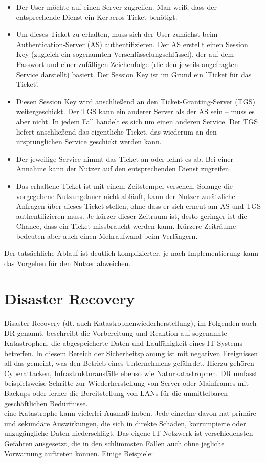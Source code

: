 \documentclass[letterpaper, 12pt]{article}
\let\tempsection\section
\renewcommand\section[1]{\vspace{-0.3cm}\tempsection{#1}\vspace{-0.3cm}}
\begin{document}
\begin{itemize}
	\item Der User möchte auf einen Server zugreifen. Man weiß, dass der entsprechende Dienst ein Kerberos-Ticket benötigt.
	\item Um dieses Ticket zu erhalten, muss sich der User zunächst beim Authentication-Server (AS) authentifizieren. Der AS erstellt einen Session Key (zugleich ein sogenannten Verschlüsselungschlüssel), der auf dem Passwort und einer zufälligen Zeichenfolge (die den jeweils angefragten Service darstellt) basiert. Der Session Key ist im Grund ein 'Ticket für das Ticket'.
	\item Diesen Session Key wird anschließend an den Ticket-Granting-Server (TGS) weitergeschickt. Der TGS kann ein anderer  Server als der AS sein – muss es aber nicht. In jedem Fall handelt es sich um einen anderen Service. Der TGS liefert anschließend das eigentliche Ticket, das wiederum an den ursprünglichen Service geschickt werden kann.
	\item Der jeweilige Service nimmt das Ticket an oder lehnt es ab. Bei einer Annahme kann der Nutzer auf den entsprechenden Dienst zugreifen. \clearpage
	\item Das erhaltene Ticket ist mit einem Zeitstempel versehen. Solange die vorgegebene Nutzungdauer nicht abläuft, kann der Nutzer zusätzliche Anfragen über dieses Ticket stellen, ohne dass er sich erneut am AS und TGS authentifizieren muss. Je kürzer dieser Zeitraum ist, desto geringer ist die Chance, dass ein Ticket missbraucht werden kann. Kürzere Zeiträume bedeuten aber auch einen Mehraufwand beim Verlängern.
\end{itemize}

Der tatsächliche Ablauf ist deutlich komplizierter, je nach Implementierung kann das Vorgehen für den Nutzer abweichen. \cite{kerberos}

\clearpage

\section{Disaster Recovery}

Disaster Recovery (dt. auch Katastrophenwiederherstellung), im Folgenden auch DR genannt, beschreibt
die Vorbereitung und Reaktion auf sogenannte Katastrophen, die abgespeicherte Daten
und Lauffähigkeit eines IT-Systems betreffen. In diesem Bereich der Sicherheitsplanung ist mit
negativen Ereignissen all das gemeint, was den Betrieb eines Unternehmens gefährdet. Hierzu gehören
Cyberattacken, Infrastrukturausfälle ebenso wie Naturkatastrophen. DR umfasst beispielsweise
Schritte zur Wiederherstellung von Server oder Mainframes mit Backups oder ferner die
Bereitstellung von LANs für die unmittelbaren geschäftlichen Bedürfnisse. \\
eine Katastrophe kann vielerlei Ausmaß haben. Jede einzelne davon hat
primäre und sekundäre Auswirkungen, die sich in direkte Schäden, korrumpierte oder unzugängliche
Daten niederschlägt. Das eigene IT-Netzwerk ist verschiedensten Gefahren ausgesetzt, die in
den schlimmsten Fällen auch ohne jegliche Vorwarnung auftreten können.
Einige Beispiele:
\end{document}
